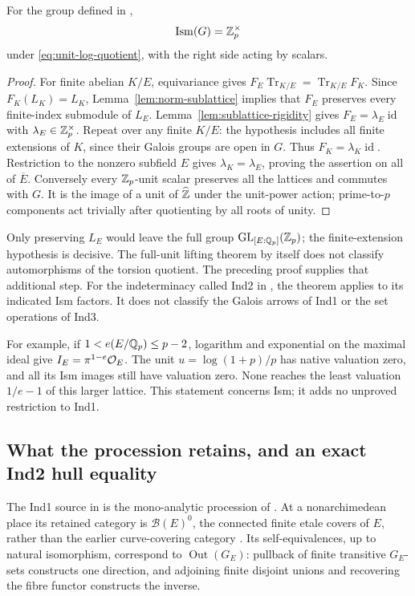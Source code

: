 \begin{theorem}
\label{thm:ism-scalar}
For the group defined in \cite[Example~1.8(iv)]{IUT2},
\[
 \operatorname{Ism}(G)=\mathbb Z_p^\times
\]
under \eqref{eq:unit-log-quotient}, with the right side acting by scalars.
\end{theorem}
\begin{proof}
For finite abelian $K/E$, equivariance gives
$F_E\operatorname{Tr}_{K/E}=\operatorname{Tr}_{K/E}F_K$.
Since $F_K(L_K)=L_K$, Lemma~\ref{lem:norm-sublattice} implies that
$F_E$ preserves every finite-index submodule of $L_E$.
Lemma~\ref{lem:sublattice-rigidity} gives
$F_E=\lambda_E\operatorname{id}$ with $\lambda_E\in\mathbb Z_p^\times$.
Repeat over any finite $K/E$: the hypothesis includes all finite
extensions of $K$, since their Galois groups are open in $G$.
Thus $F_K=\lambda_K\operatorname{id}$. Restriction to the nonzero
subfield $E$ gives $\lambda_K=\lambda_E$, proving the assertion on
all of $\overline E$. Conversely every $\mathbb Z_p$-unit scalar preserves
all the lattices and commutes with $G$. It is the image of a unit of
$\widehat{\mathbb Z}$ under the unit-power action; prime-to-$p$ components act
trivially after quotienting by all roots of unity.
\end{proof}

Only preserving $L_E$ would leave the full group
$\operatorname{GL}_{[E:\mathbb Q_p]}(\mathbb Z_p)$; the finite-extension hypothesis is decisive.
The full-unit lifting theorem \cite[Theorem~7.6]{Hoshi} by itself does
not classify automorphisms of the torsion quotient. The preceding proof
supplies that additional step. For the indeterminacy called Ind2 in
\cite[Theorem~3.11(i)]{IUT3}, the theorem applies to its indicated Ism
factors. It does not classify the Galois arrows of Ind1 or the set
operations of Ind3.

For example, if $1<e(E/\mathbb Q_p)\le p-2$, logarithm and exponential on the
maximal ideal give $I_E=\pi^{1-e}\mathcal O_E$. The unit
$u=\log(1+p)/p$ has native valuation zero, and all its Ism images
still have valuation zero. None reaches the least valuation $1/e-1$
of this larger lattice. This statement concerns Ism; it adds no
unproved restriction to Ind1.

\subsection{What the procession retains, and an exact Ind2 hull equality}

The Ind1 source in \cite[Theorem~3.11(i)]{IUT3} is the mono-analytic
procession of \cite[Proposition~6.9(ii)]{IUT1}. At a nonarchimedean
place its retained category is $\mathcal B(E)^0$, the connected finite
etale covers of $E$, rather than the earlier curve-covering category
\cite[Examples~3.2(i), 3.3(i), Definition~4.1(iii)--(iv)]{IUT1}.
Its self-equivalences, up to natural isomorphism, correspond to
$\operatorname{Out}(G_E)$: pullback of finite transitive $G_E$-sets
constructs one direction, and adjoining finite disjoint unions and
recovering the fibre functor constructs the inverse.

